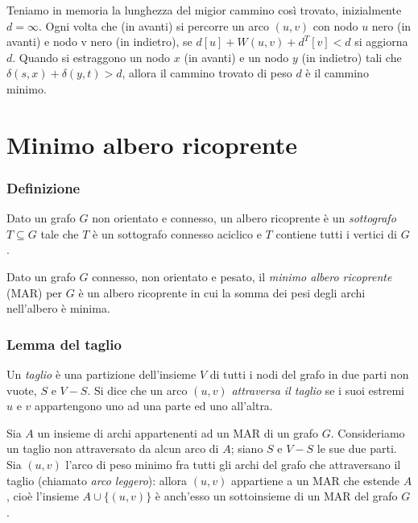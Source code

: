 \documentclass[11pt]{book}
\begin{document}
Teniamo in memoria la lunghezza del migior cammino così trovato, inizialmente $d=\infty$. Ogni volta che (in avanti) si percorre 
un arco $(u,v)$ con nodo $u$ nero (in avanti) e nodo v nero (in indietro), se $d[u]+W(u,v)+d^T[v]<d$ si aggiorna $d$.
Quando si estraggono un nodo $x$ (in avanti) e un nodo $y$ (in indietro) tali che $\delta(s,x)+\delta(y,t)>d$, allora il 
cammino trovato di peso $d$ è il cammino minimo.
\section{Minimo albero ricoprente}
\subsubsection{Definizione}
Dato un grafo $G$ non orientato e connesso, un albero ricoprente è un \textit{sottografo} $T\subseteq G$ tale che $T$ è 
un sottografo connesso aciclico e $T$ contiene tutti i vertici di $G$.

Dato un grafo $G$ connesso, non orientato e pesato, il \textit{minimo albero ricoprente} (MAR) per $G$ è un albero ricoprente 
in cui la somma dei pesi degli archi nell'albero è minima.
\subsubsection{Lemma del taglio}
Un \textit{taglio} è una partizione dell'insieme $V$ di tutti i nodi del grafo in due parti non vuote, $S$ e $V-S$. Si dice 
che un arco $(u,v)$ \textit{attraversa il taglio} se i suoi estremi $u$ e $v$ appartengono uno ad una parte ed uno all'altra.

Sia $A$ un insieme di archi appartenenti ad un MAR di un grafo $G$. Consideriamo un taglio non attraversato da alcun arco 
di $A$; siano $S$ e $V-S$ le sue due parti. Sia $(u,v)$ l'arco di peso minimo fra tutti gli archi del grafo che attraversano 
il taglio (chiamato \textit{arco leggero}): allora $(u,v)$ appartiene a un MAR che estende $A$, cioè l'insieme $A\cup \{(u,v)\}$
è anch'esso un sottoinsieme di un MAR del grafo $G$. 
\end{document}

